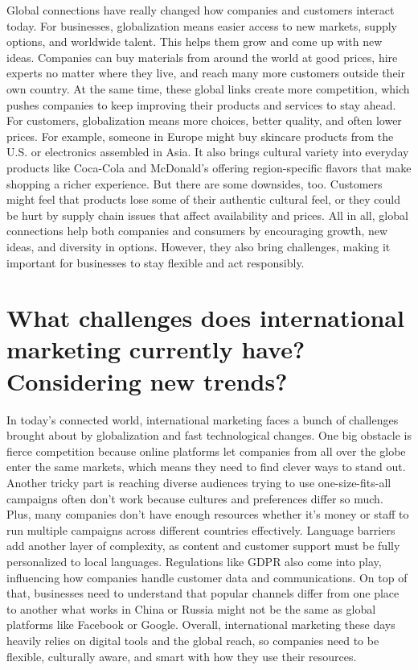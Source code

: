 \documentclass[letterpaper, 12pt]{report}
\begin{document}
Global connections have really changed how companies and customers interact
today. For businesses, globalization means easier access to new markets, supply
options, and worldwide talent. This helps them grow and come up with new ideas.
Companies can buy materials from around the world at good prices, hire experts
no matter where they live, and reach many more customers outside their own
country. At the same time, these global links create more competition, which
pushes companies to keep improving their products and services to stay ahead.
For customers, globalization means more choices, better quality, and often
lower prices. For example, someone in Europe might buy skincare products from
the U.S. or electronics assembled in Asia. It also brings cultural variety into
everyday products like Coca-Cola and McDonald's offering region-specific
flavors that make shopping a richer experience. But there are some downsides,
too. Customers might feel that products lose some of their authentic cultural
feel, or they could be hurt by supply chain issues that affect availability and
prices. All in all, global connections help both companies and consumers by
encouraging growth, new ideas, and diversity in options. However, they also
bring challenges, making it important for businesses to stay flexible and act
responsibly.

\section{What challenges does international marketing currently have? Considering new trends?}

In today's connected world, international marketing faces a bunch of challenges
brought about by globalization and fast technological changes. One big obstacle
is fierce competition because online platforms let companies from all over the
globe enter the same markets, which means they need to find clever ways to
stand out. Another tricky part is reaching diverse audiences trying to use
one-size-fits-all campaigns often don’t work because cultures and preferences
differ so much. Plus, many companies don’t have enough resources whether it’s
money or staff to run multiple campaigns across different countries
effectively. Language barriers add another layer of complexity, as content and
customer support must be fully personalized to local languages. Regulations
like GDPR also come into play, influencing how companies handle customer data
and communications. On top of that, businesses need to understand that popular
channels differ from one place to another what works in China or Russia might
not be the same as global platforms like Facebook or Google. Overall,
international marketing these days heavily relies on digital tools and the
global reach, so companies need to be flexible, culturally aware, and smart
with how they use their resources.

\printbibliography
\end{document}
